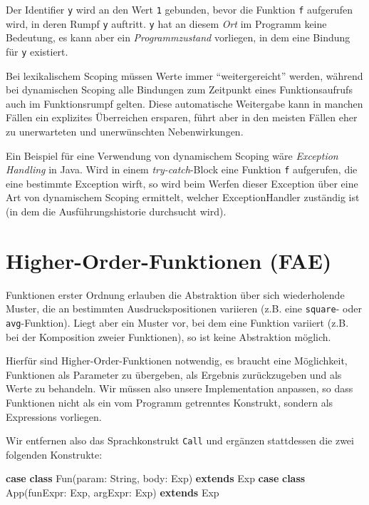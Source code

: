 \documentclass[]{article}
\newenvironment{Shaded}{}{}
\newcommand{\FunctionTok}[1]{\textcolor[rgb]{0.02,0.16,0.49}{#1}}
\newcommand{\KeywordTok}[1]{\textcolor[rgb]{0.00,0.44,0.13}{\textbf{#1}}}
\newcommand{\NormalTok}[1]{#1}
\begin{document}
Der Identifier \texttt{y} wird an den Wert \texttt{1} gebunden, bevor
die Funktion \texttt{f} aufgerufen wird, in deren Rumpf \texttt{y}
auftritt. \texttt{y} hat an diesem \emph{Ort} im Programm keine
Bedeutung, es kann aber ein \emph{Programmzustand} vorliegen, in dem
eine Bindung für \texttt{y} existiert.

Bei lexikalischem Scoping müssen Werte immer ``weitergereicht'' werden,
während bei dynamischen Scoping alle Bindungen zum Zeitpunkt eines
Funktionsaufrufs auch im Funktionsrumpf gelten. Diese automatische
Weitergabe kann in manchen Fällen ein explizites Überreichen ersparen,
führt aber in den meisten Fällen eher zu unerwarteten und unerwünschten
Nebenwirkungen.

Ein Beispiel für eine Verwendung von dynamischem Scoping wäre
\emph{Exception Handling} in Java. Wird in einem \emph{try-catch}-Block
eine Funktion \texttt{f} aufgerufen, die eine bestimmte Exception wirft,
so wird beim Werfen dieser Exception über eine Art von dynamischem
Scoping ermittelt, welcher ExceptionHandler zuständig ist (in dem die
Ausführungshistorie durchsucht wird).

\hypertarget{higher-order-funktionen-fae}{%
\section{Higher-Order-Funktionen
(FAE)}\label{higher-order-funktionen-fae}}

Funktionen erster Ordnung erlauben die Abstraktion über sich
wiederholende Muster, die an bestimmten Ausdruckspositionen variieren
(z.B. eine \texttt{square}- oder \texttt{avg}-Funktion). Liegt aber ein
Muster vor, bei dem eine Funktion variiert (z.B. bei der Komposition
zweier Funktionen), so ist keine Abstraktion möglich.

Hierfür sind Higher-Order-Funktionen notwendig, es braucht eine
Möglichkeit, Funktionen als Parameter zu übergeben, als Ergebnis
zurückzugeben und als Werte zu behandeln. Wir müssen also unsere
Implementation anpassen, so dass Funktionen nicht als ein vom Programm
getrenntes Konstrukt, sondern als Expressions vorliegen.

Wir entfernen also das Sprachkonstrukt \texttt{Call} und ergänzen
stattdessen die zwei folgenden Konstrukte:

\begin{Shaded}
\begin{Highlighting}[]
\KeywordTok{case} \KeywordTok{class} \FunctionTok{Fun}\NormalTok{(param: String, body: Exp) }\KeywordTok{extends}\NormalTok{ Exp}
\KeywordTok{case} \KeywordTok{class} \FunctionTok{App}\NormalTok{(funExpr: Exp, argExpr: Exp) }\KeywordTok{extends}\NormalTok{ Exp}
\end{Highlighting}
\end{Shaded}
\end{document}
